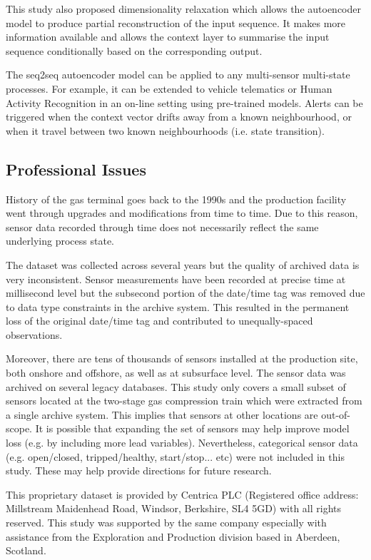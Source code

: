 \documentclass[11pt]{article} %
\theoremstyle{plain}
\theoremstyle{definition}
\begin{document}
This study also proposed dimensionality relaxation which allows the autoencoder model to produce partial reconstruction of the input sequence. It makes more information available and allows the context layer to summarise the input sequence conditionally based on the corresponding output.

The seq2seq autoencoder model can be applied to any multi-sensor multi-state processes. For example, it can be extended to vehicle telematics or Human Activity Recognition in an on-line setting using pre-trained models. Alerts can be triggered when the context vector drifts away from a known neighbourhood, or when it travel between two known neighbourhoods (i.e. state transition).

\subsection{Professional Issues}

History of the gas terminal goes back to the 1990s and the production facility went through upgrades and modifications from time to time. Due to this reason, sensor data recorded through time does not necessarily reflect the same underlying process state.

The dataset was collected across several years but the quality of archived data is very inconsistent. Sensor measurements have been recorded at precise time at millisecond level but the subsecond portion of the date/time tag was removed due to data type constraints in the archive system. This resulted in the permanent loss of the original date/time tag and contributed to unequally-spaced observations.

Moreover, there are tens of thousands of sensors installed at the production site, both onshore and offshore, as well as at subsurface level. The sensor data was archived on several legacy databases. This study only covers a small subset of sensors located at the two-stage gas compression train which were extracted from a single archive system. This implies that sensors at other locations are out-of-scope. It is possible that expanding the set of sensors may help improve model loss (e.g. by including more lead variables). Nevertheless, categorical sensor data (e.g. open/closed, tripped/healthy, start/stop... etc) were not included in this study. These may help provide directions for future research.

This proprietary dataset is provided by Centrica PLC (Registered office address: Millstream Maidenhead Road, Windsor, Berkshire, SL4 5GD) with all rights reserved. This study was supported by the same company especially with assistance from the Exploration and Production division based in Aberdeen, Scotland.
\end{document}
